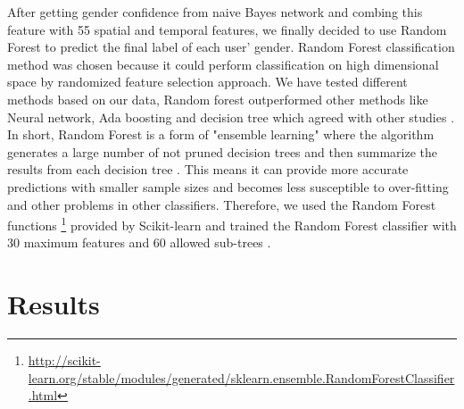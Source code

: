 \documentclass{article}
\begin{document}
After getting gender confidence from naive Bayes network and combing this feature with 55 spatial and temporal features, we finally decided to use Random Forest to predict the final label of each user'  gender. Random Forest classification method was chosen because it could perform classification on high dimensional space by randomized feature selection approach\cite{breiman2001random}.  We have tested different methods based on our data, Random forest outperformed other methods like Neural network, Ada boosting and decision tree which agreed with other studies \cite{liaw2002classification}. In short, Random Forest is a form of "ensemble learning" where the algorithm generates a large number of not pruned decision trees and then summarize the results from each decision tree \cite{breiman2001random}. This means it can provide more accurate predictions with smaller sample sizes and becomes less susceptible to over-fitting and other problems in other classifiers. Therefore, we used the Random Forest functions \footnote{\url{http://scikit-learn.org/stable/modules/generated/sklearn.ensemble.RandomForestClassifier.html}} provided by Scikit-learn and trained the Random Forest classifier with 30 maximum features and 60 allowed sub-trees \cite{scikit-learn}.

\section{Results}
\end{document}
